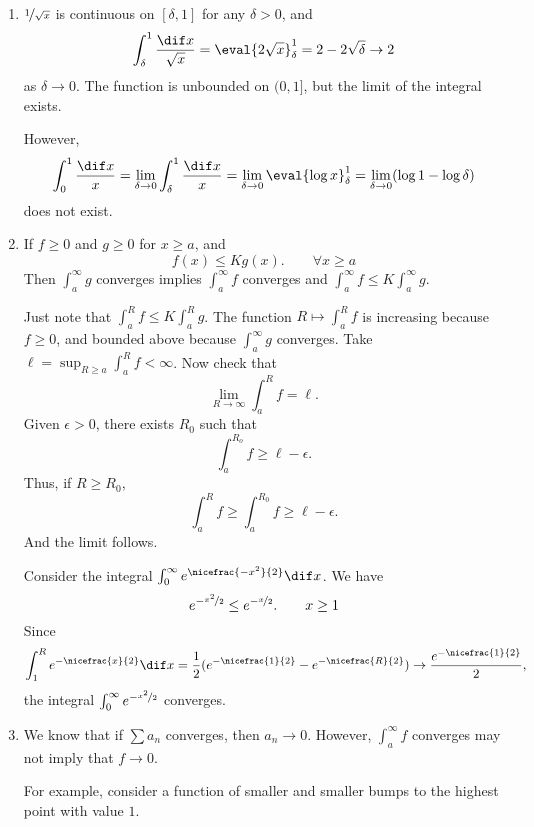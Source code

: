 \begin{remark}
    \begin{enumerate}
        \item \(\nicefrac{1}{\sqrt{x}}\) is continuous on \([\delta, 1]\) for any \(\delta > 0\), and
        \[
            \int^1_\delta \frac{\dif x}{\sqrt{x}} = \eval{2\sqrt{x}}^1_\delta = 2 - 2\sqrt{\delta} \to 2
        \]
        as \(\delta \to 0\). The function is unbounded on \((0,1]\), but the limit of the integral exists.
        
        However,
        \[
            \int^1_0 \frac{\dif x}{x} = \lim_{\delta \to 0} \int^1_\delta \frac{\dif x}{x} = \lim_{\delta \to 0} \eval{\log x}^1_\delta = \lim_{\delta \to 0} (\log 1 - \log \delta)
        \]
        does not exist.
        \item If \(f \geq 0\) and \(g \geq 0\) for \(x \geq a\), and
        \[
            f(x) \leq Kg(x). \qquad \forall x\geq a
        \]
        Then \(\int^{\infty}_a g\) converges implies \(\int^\infty_a f\) converges and \(\int^\infty_a f \leq K \int^\infty_a g\).

        Just note that \(\int^R_a f \leq K \int^R_a g\). The function \(R \mapsto \int^R_a f\) is increasing because \(f \geq 0\), and bounded above because \(\int^\infty_a g\) converges. Take \(\ell = \sup_{R\geq a} \int^R_a f < \infty\). Now check that
        \[
            \lim_{R \to \infty} \int^R_a f = \ell.
        \]
        Given \(\epsilon>0\), there exists \(R_0\) such that
        \[
            \int^{R_o}_a f \geq \ell - \epsilon.
        \]
        Thus, if \(R \geq R_0\),
        \[
            \int^R_a f \geq \int^{R_0}_a f \geq \ell-\epsilon.
        \]
        And the limit follows.
        \begin{example}
            Consider the integral \(\int^\infty_0 e^{\nicefrac{-x^2}{2}} \dif x\). We have
            \[
                e^{-\nicefrac{x^2}{2}} \leq e^{-\nicefrac{x}{2}}. \qquad x \geq 1
            \]
            Since
            \[
                \int_1^R e^{-\nicefrac{x}{2}} \dif x = \frac{1}{2}(e^{-\nicefrac{1}{2}} - e^{-\nicefrac{R}{2}}) \to \frac{e^{-\nicefrac{1}{2}}}{2},
            \]
            the integral \(\int^\infty_0 e^{-\nicefrac{x^2}{2}}\) converges.
        \end{example}
        \item We know that if \(\sum a_n\) converges, then \(a_n \to 0\). However, \(\int^\infty_a f\) converges may not imply that \(f \to 0\).

        For example, consider a function of smaller and smaller bumps to the highest point with value \(1\).
    \end{enumerate}
\end{remark}
